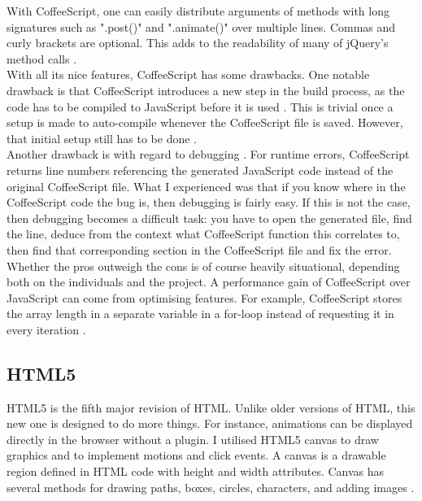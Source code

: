 \documentclass[titlepage,a4paper,11pt]{report}
\begin{document}
\indent With CoffeeScript, one can easily distribute arguments of methods with long signatures such as ".post()" and ".animate()" over multiple lines. Commas and curly brackets are optional. This adds to the readability of many of jQuery's method calls \citep{jash}.\\

\indent With all its nice features, CoffeeScript has some drawbacks. One notable drawback is that CoffeeScript introduces a new step in the build process, as the code has to be compiled to JavaScript before it is used \citep{david}. This is trivial once a setup is made to auto-compile whenever the CoffeeScript file is saved. However, that initial setup still has to be done \citep{waller}.\\

\indent Another drawback is with regard to debugging \citep{waller}. For runtime errors, CoffeeScript returns line numbers referencing the generated JavaScript code instead of the original CoffeeScript file. What I experienced was that if you know where in the CoffeeScript code the bug is, then debugging is fairly easy. If this is not the case, then debugging becomes a difficult task: you have to open the generated file, find the line, deduce from the context what CoffeeScript function this correlates to, then find that corresponding section in the CoffeeScript file and fix the error.\\

\indent Whether the pros outweigh the cons is of course heavily situational, depending both on the individuals and the project. A performance gain of CoffeeScript over JavaScript can come from optimising features. For example, CoffeeScript stores the array length in a separate variable in a for-loop instead of requesting it in every iteration \citep{jash}. 


\subsection{HTML5}
HTML5 is the fifth major revision of HTML. Unlike older versions of HTML, this new one is designed to do more things. For instance, animations can be displayed directly in the browser without a plugin.
I utilised HTML5 canvas to draw graphics and to implement motions and click events. A canvas is a drawable region defined in HTML code with height and width attributes. Canvas has several methods for drawing paths, boxes, circles, characters, and adding images \citep{w3}.\\
\end{document}
